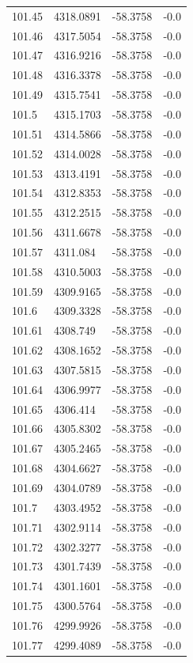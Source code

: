 \begin{table}[H]
\begin{tabular}{llll}
101.45 & 4318.0891 & -58.3758 & -0.0 \\
101.46 & 4317.5054 & -58.3758 & -0.0 \\
101.47 & 4316.9216 & -58.3758 & -0.0 \\
101.48 & 4316.3378 & -58.3758 & -0.0 \\
101.49 & 4315.7541 & -58.3758 & -0.0 \\
101.5 & 4315.1703 & -58.3758 & -0.0 \\
101.51 & 4314.5866 & -58.3758 & -0.0 \\
101.52 & 4314.0028 & -58.3758 & -0.0 \\
101.53 & 4313.4191 & -58.3758 & -0.0 \\
101.54 & 4312.8353 & -58.3758 & -0.0 \\
101.55 & 4312.2515 & -58.3758 & -0.0 \\
101.56 & 4311.6678 & -58.3758 & -0.0 \\
101.57 & 4311.084 & -58.3758 & -0.0 \\
101.58 & 4310.5003 & -58.3758 & -0.0 \\
101.59 & 4309.9165 & -58.3758 & -0.0 \\
101.6 & 4309.3328 & -58.3758 & -0.0 \\
101.61 & 4308.749 & -58.3758 & -0.0 \\
101.62 & 4308.1652 & -58.3758 & -0.0 \\
101.63 & 4307.5815 & -58.3758 & -0.0 \\
101.64 & 4306.9977 & -58.3758 & -0.0 \\
101.65 & 4306.414 & -58.3758 & -0.0 \\
101.66 & 4305.8302 & -58.3758 & -0.0 \\
101.67 & 4305.2465 & -58.3758 & -0.0 \\
101.68 & 4304.6627 & -58.3758 & -0.0 \\
101.69 & 4304.0789 & -58.3758 & -0.0 \\
101.7 & 4303.4952 & -58.3758 & -0.0 \\
101.71 & 4302.9114 & -58.3758 & -0.0 \\
101.72 & 4302.3277 & -58.3758 & -0.0 \\
101.73 & 4301.7439 & -58.3758 & -0.0 \\
101.74 & 4301.1601 & -58.3758 & -0.0 \\
101.75 & 4300.5764 & -58.3758 & -0.0 \\
101.76 & 4299.9926 & -58.3758 & -0.0 \\
101.77 & 4299.4089 & -58.3758 & -0.0 \\

\end{tabular}
\end{table}
